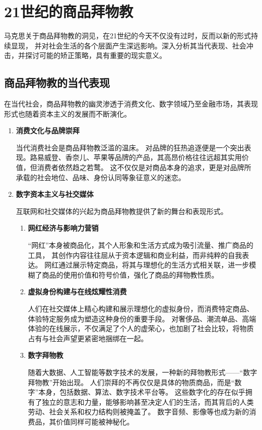\section{21世纪的商品拜物教}
马克思关于商品拜物教的洞见，在21世纪的今天不仅没有过时，反而以新的形式持续显现，
并对社会生活的各个层面产生深远影响。深入分析其当代表现、社会冲击，并探讨可能的矫正策略，具有重要的现实意义。
\subsection{商品拜物教的当代表现}
在当代社会，商品拜物教的幽灵渗透于消费文化、数字领域乃至金融市场，其表现形式也随着资本主义的发展而不断演化。
\begin{enumerate}
    \item \textbf{消费文化与品牌崇拜}

    当代消费社会是商品拜物教泛滥的温床。
    对品牌的狂热追逐便是一个突出表现。路易威登、香奈儿、苹果等品牌的产品，其高昂价格往往远超其实用价值，但消费者依然趋之若鹜。
    这不仅仅是对商品本身的追求，更是对品牌所承载的社会地位、品味、身份认同等象征意义的迷恋。

    \item \textbf{数字资本主义与社交媒体}

    互联网和社交媒体的兴起为商品拜物教提供了新的舞台和表现形式。

    \begin{enumerate}
        \item \textbf{网红经济与影响力营销}

        “网红”本身被商品化，其个人形象和生活方式成为吸引流量、推广商品的工具，
        其创作内容往往屈从于资本逻辑和商业利益，而非纯粹的自我表达。
        网红通过展示特定商品，将其与理想化的生活方式相关联，进一步模糊了商品的使用价值和符号价值，强化了商品的拜物教性质。
        \item \textbf{虚拟身份构建与在线炫耀性消费}

        人们在社交媒体上精心构建和展示理想化的虚拟身份，而消费特定商品、体验特定服务成为塑造这种身份的重要手段。
        对奢侈品、潮流单品、高端体验的在线展示，不仅满足了个人的虚荣心，也加剧了社会比较，将物质占有与社会声望更紧密地捆绑在一起。
        \item \textbf{数字拜物教}

        随着大数据、人工智能等数字技术的发展，一种新的拜物教形式——“数字拜物教”开始出现。
        人们崇拜的不再仅仅是具体的物质商品，而是“数字”本身，包括数据、算法、数字技术平台等。
        这些数字化的存在似乎拥有了独立的意志和力量，能够影响甚至决定人们的生活，而其背后的人类劳动、社会关系和权力结构则被掩盖了。
        数字音频、影像等也成为新的消费品，其价值同样可能被神秘化。
    \end{enumerate}

\end{enumerate}

